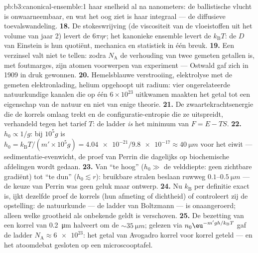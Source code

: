 \begin{solution}{pb:b3:canonical-ensemble:1}
haar snelheid al na nanometers: de ballistische vlucht is onwaarneembaar,
en wat het oog ziet is haar integraal --- de diffusieve toevalswandeling.
\textbf{18.} De stokeswrijving (de viscositeit van de vloeistoffen uit het
volume van jaar 2) levert de $6\pi\eta r$; het kanonieke ensemble levert de
$k_{\text{B}}T$: de $D$ van Einstein is hun quotiënt, mechanica en
statistiek in één breuk.
\textbf{19.} Een verzinsel valt niet te tellen: zodra $N_{\text{A}}$ de
verhouding van twee gemeten getallen is, met foutmarges, zijn atomen
voorwerpen van experiment --- Ostwald gaf zich in 1909 in druk gewonnen.
\textbf{20.} Hemelsblauwe verstrooiing, elektrolyse met de gemeten
elektronlading, helium opgehoopt uit radium: vier ongerelateerde
natuurkundige kanalen die op één $6\times10^{23}$ uitkwamen maakten het
getal tot een eigenschap van de natuur en niet van enige theorie.
\textbf{21.} De zwaartekrachtsenergie die de korrels omlaag trekt en de
configuratie-entropie die ze uitspreidt, verhandeld tegen het tarief $T$:
de ladder \emph{is} het minimum van $F = E - TS$.
\textbf{22.} $h_0 \propto 1/g$: bij $10^5g$ is
$h_0 = k_{\text{B}}T/(m'\times10^5g) = \num{4.04e-21}/
\num{9.8e-17} \approx \qty{40}{\micro m}$ voor het eiwit ---
sedimentatie-evenwicht, de proef van Perrin die dagelijks op
biochemische afdelingen wordt gedaan.
\textbf{23.} Van ``te hoog'' ($h_0 \gg$ de velddiepte: geen zichtbare
gradiënt) tot ``te dun'' ($h_0 \lesssim r$): bruikbare stralen beslaan
ruwweg $0.1$--$\qty{0.5}{\micro m}$ --- de keuze van Perrin was geen geluk
maar ontwerp.
\textbf{24.} Nu $k_{\text{B}}$ per definitie exact is, ijkt dezelfde proef
de korrels (hun afmeting of dichtheid) of controleert zij de opstelling:
de natuurkunde --- de ladder van Boltzmann --- is onaangeroerd; alleen
welke grootheid als onbekende geldt is verschoven.
\textbf{25.} De bezetting van een korrel van \qty{0.2}{\micro m} halveert
om de $\sim\qty{35}{\micro m}$; gelezen via $n_0\eu^{-m'gh/k_{\text{B}}
T}$ gaf de ladder $N_{\text{A}} \approx \num{6e23}$: het getal van
Avogadro korrel voor korrel geteld --- en het atoomdebat gesloten op een
microscooptafel.
\end{solution}
